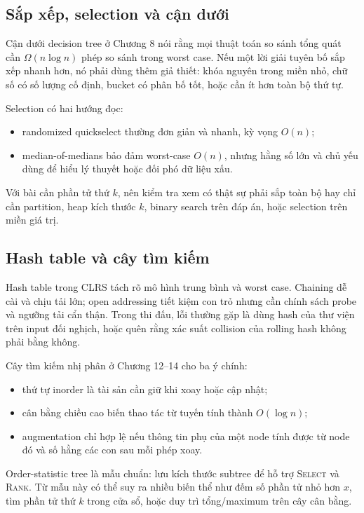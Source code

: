 \documentclass[11pt]{article}
\begin{document}
\subsection{Sắp xếp, selection và cận dưới}

Cận dưới decision tree ở Chương 8 nói rằng mọi thuật toán so sánh tổng quát cần
\(\Omega(n\log n)\) phép so sánh trong worst case. Nếu một lời giải tuyên bố sắp
xếp nhanh hơn, nó phải dùng thêm giả thiết: khóa nguyên trong miền nhỏ, chữ số
có số lượng cố định, bucket có phân bố tốt, hoặc cần ít hơn toàn bộ thứ tự.

Selection có hai hướng đọc:
\begin{itemize}
  \item randomized quickselect thường đơn giản và nhanh, kỳ vọng \(O(n)\);
  \item median-of-medians bảo đảm worst-case \(O(n)\), nhưng hằng số lớn và
        chủ yếu dùng để hiểu lý thuyết hoặc đối phó dữ liệu xấu.
\end{itemize}
Với bài cần phần tử thứ \(k\), nên kiểm tra xem có thật sự phải sắp toàn bộ hay
chỉ cần partition, heap kích thước \(k\), binary search trên đáp án, hoặc
selection trên miền giá trị.

\subsection{Hash table và cây tìm kiếm}

Hash table trong CLRS tách rõ mô hình trung bình và worst case. Chaining dễ cài
và chịu tải lớn; open addressing tiết kiệm con trỏ nhưng cần chính sách probe và
ngưỡng tải cẩn thận. Trong thi đấu, lỗi thường gặp là dùng hash của thư viện
trên input đối nghịch, hoặc quên rằng xác suất collision của rolling hash không
phải bằng không.

Cây tìm kiếm nhị phân ở Chương 12--14 cho ba ý chính:
\begin{itemize}
  \item thứ tự inorder là tài sản cần giữ khi xoay hoặc cập nhật;
  \item cân bằng chiều cao biến thao tác từ tuyến tính thành \(O(\log n)\);
  \item augmentation chỉ hợp lệ nếu thông tin phụ của một node tính được từ
        node đó và số hằng các con sau mỗi phép xoay.
\end{itemize}
Order-statistic tree là mẫu chuẩn: lưu kích thước subtree để hỗ trợ
\textsc{Select} và \textsc{Rank}. Từ mẫu này có thể suy ra nhiều biến thể như
đếm số phần tử nhỏ hơn \(x\), tìm phần tử thứ \(k\) trong cửa sổ, hoặc duy trì
tổng/maximum trên cây cân bằng.
\end{document}
